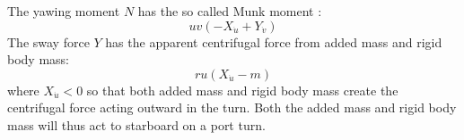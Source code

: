 The yawing moment $N$ has the so called Munk moment \citep{fossenHandbookMarineCraft2011}:
$$
u v \left(- X_{\dot{u}} + Y_{\dot{v}}\right)
$$
The sway force $Y$ has the apparent centrifugal force from added mass and rigid body mass: 
$$r u \left(X_{\dot{u}} - m\right)$$ where $X_{\dot{u}}<0$ so that both added mass and rigid body mass create the centrifugal force acting outward in the turn. Both the added mass and rigid body mass will thus act to starboard on a port turn.
